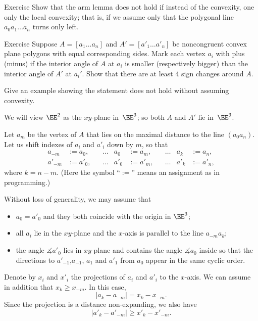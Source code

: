 \begin{thm}{Exercise}\label{ex:arm-nonconvex}
Show that the arm lemma does not hold if 
instead of the convexity,
one only the local convexity;
that is, if we assume only that the polygonal line $a_0 a_1\dots a_n$ turns only left.
\end{thm}

\begin{thm}{Exercise}\label{ex:cauchy}
Suppose $A=[a_1\dots a_n]$ and $A'=[a'_1\dots a'_n]$ be noncongruent convex plane polygons with equal corresponding sides.
Mark each vertex $a_i$ with plus (minus) if the interior angle of $A$ at $a_i$ is smaller (respectively bigger) than the interior angle of $A'$ at $a_i'$.
Show that there are at least 4 sign changes around $A$. %

Give an example showing the statement does not hold without assuming convexity.

\end{thm}

We will view $\EE^2$ as the $xy$-plane in~$\EE^3$; 
so both $A$ and $A'$ lie in~$\EE^3$.

Let $a_m$ be the vertex of $A$ that lies on the maximal distance to the line $(a_0a_n)$.
Let us shift indexes of $a_i$ and $a'_i$ down by $m$,
so that 
\begin{align*}
a_{-m}&:=a_0,
&&\dots
&
a_{0}&:=a_m,
&&\dots
&
a_k&:=a_n,
\\
a'_{-m}&:=a'_0,
&&\dots
&
a'_{0}&:=a'_m,
&&\dots
&
a'_k&:=a'_n,
\end{align*}
where $k=n-m$.
(Here the symbol ``$:=$'' means an assignment as in programming.)

Without loss of generality, we may assume that
\begin{itemize}
\item $a_0=a'_0$ and they both coincide with the origin in $\EE^3$;
\item all $a_i$ lie in the $xy$-plane and the $x$-axis is parallel to the line $a_{-m}a_k$;
\item the angle $\measuredangle a'_0$ lies in $xy$-plane and contains the angle $\measuredangle a_0$ inside so that the directions to $a'_{-1}$,$a_{-1}$, $a_{1}$ and $a'_{1}$ from $a_0$ appear in the same cyclic order.
\end{itemize}

Denote by $x_i$ and $x'_i$ the projections of $a_i$ and $a'_i$ to the $x$-axis.
We can assume in addition that $x_k\ge x_{-m}$.
In this case,
$$|a_k-a_{-m}|=x_k-x_{-m}.$$
Since the projection is a distance non-expanding, we also have
$$|a'_k-a'_{-m}|\ge x'_k-x'_{-m}.$$ 

